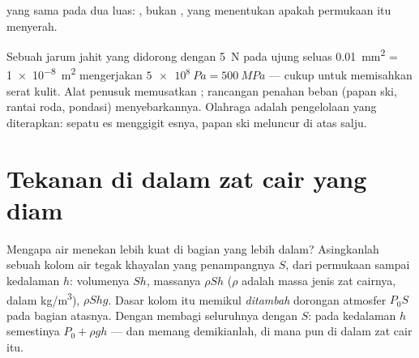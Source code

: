 \begin{omfigure}
\qquad
{}

{\small {} yang sama pada dua luas: , bukan , yang menentukan apakah permukaan itu menyerah.}
\end{omfigure}

\begin{remark}\label{rem:g10:pressure:tools}
Sebuah jarum jahit yang didorong dengan \qty{5}{N} pada ujung seluas
\qty{0.01}{mm^2} = \qty{1e-8}{m^2} mengerjakan
$\qty{5e8}{Pa} = \qty{500}{MPa}$ --- cukup untuk memisahkan serat kulit.
Alat penusuk memusatkan ; rancangan penahan beban (papan ski, rantai
roda, pondasi) menyebarkannya. Olahraga adalah pengelolaan  yang
diterapkan: sepatu es menggigit esnya, papan ski meluncur di atas salju.
\end{remark}

\section{Tekanan di dalam zat cair yang diam}

Mengapa air menekan lebih kuat di bagian yang lebih dalam? Asingkanlah
sebuah kolom air tegak khayalan yang penampangnya $S$, dari permukaan
sampai kedalaman $h$: volumenya $Sh$, massanya $\rho S h$ ($\rho$ adalah
massa jenis zat cairnya, dalam \unit{kg/m^3}),  $\rho S h g$.
Dasar kolom itu memikul  \emph{ditambah} dorongan atmosfer
$P_0 S$ pada bagian atasnya. Dengan membagi  seluruhnya dengan $S$:
 pada kedalaman $h$ semestinya $P_0 + \rho g h$ --- dan memang
demikianlah, di mana pun di dalam zat cair itu.

